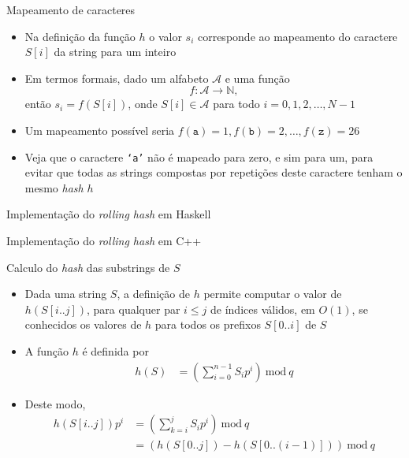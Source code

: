 \begin{frame}[fragile]{Mapeamento de caracteres}

    \begin{itemize}
        \item Na definição da função $h$ o valor $s_i$ corresponde ao mapeamento do caractere
        $S[i]$ da string para um inteiro
        \pause


        \item Em termos formais, dado um alfabeto $\mathcal{A}$ e uma função
        \[
            f : \mathcal{A} \to \mathbb{N},
        \]
        então $s_i = f(S[i])$, onde $S[i]\in\mathcal{A}$ para todo $i = 0, 1, 2, \ldots, N - 1$
        \pause


        \item Um mapeamento possível seria $f(\mathtt{a}) = 1, f(\mathtt{b}) = 2, \ldots,
        f(\mathtt{z}) = 26$
        \pause


        \item Veja que o caractere \texttt{`a'} não é mapeado para zero, e sim para um, para
            evitar que todas as strings compostas por repetições deste caractere tenham o 
            mesmo \textit{hash} $h$
    \end{itemize}

\end{frame}

\begin{frame}[fragile]{Implementação do {\it rolling hash} em Haskell}
\end{frame}

\begin{frame}[fragile]{Implementação do {\it rolling hash} em C++}
\end{frame}

\begin{frame}[fragile]{Calculo do {\it hash} das substrings de $S$}

    \begin{itemize}
        \item Dada uma string $S$, a definição de $h$ permite computar o valor de $h(S[i..j])$,
            para qualquer par $i\leq j$ de índices válidos, em $O(1)$, se conhecidos os valores
            de $h$ para todos os prefixos $S[0..i]$ de $S$
        \pause

        
        \item A função $h$ é definida por
        \begin{align*}
        h(S) &= \left(\sum_{i=0}^{n - 1} S_ip^i\right)\ \mbox{mod}\ q
        \end{align*}
        \pause


        \item Deste modo,
        \begin{align*}
        h(S[i..j])p^i &= \left(\sum_{k=i}^{j} S_ip^i\right)\ \mbox{mod}\ q \\
        &= \left(h(S[0..j]) - h(S[0..(i - 1)])\right) \ \mbox{mod}\ q
        \end{align*}
    \end{itemize}

\end{frame}

